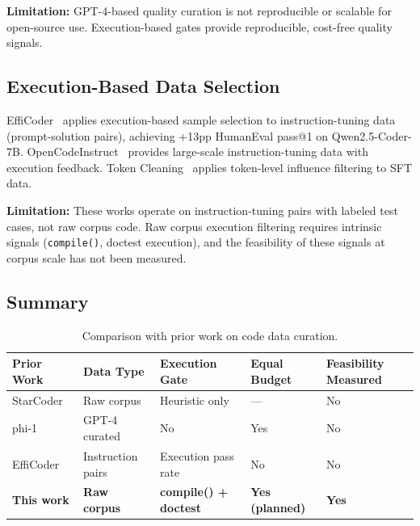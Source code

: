 \textbf{Limitation:} GPT-4-based quality curation is not reproducible or scalable for
open-source use. Execution-based gates provide reproducible, cost-free quality signals.

\subsection{Execution-Based Data Selection}

EffiCoder~\cite{Zeng2024EffiCoder} applies execution-based sample selection to instruction-tuning
data (prompt-solution pairs), achieving +13pp HumanEval pass@1 on Qwen2.5-Coder-7B.
OpenCodeInstruct~\cite{OpenCodeInstruct2025} provides large-scale instruction-tuning data with execution
feedback. Token Cleaning~\cite{TokenCleaning2025} applies token-level influence filtering to SFT data.

\textbf{Limitation:} These works operate on instruction-tuning pairs with labeled test cases,
not raw corpus code. Raw corpus execution filtering requires intrinsic signals (\texttt{compile()},
doctest execution), and the feasibility of these signals at corpus scale has not been measured.

\subsection{Summary}

\begin{table}[h]
\centering
\caption{Comparison with prior work on code data curation.}
\label{tab:related}
\begin{tabular}{lllll}
\toprule
\textbf{Prior Work} & \textbf{Data Type} & \textbf{Execution Gate} & \textbf{Equal Budget} & \textbf{Feasibility Measured} \\
\midrule
StarCoder~\cite{Li2023StarCoder} & Raw corpus & Heuristic only & --- & No \\
phi-1~\cite{Gunasekar2023Textbooks} & GPT-4 curated & No & Yes & No \\
EffiCoder~\cite{Zeng2024EffiCoder} & Instruction pairs & Execution pass rate & No & No \\
\textbf{This work} & \textbf{Raw corpus} & \textbf{compile() + doctest} & \textbf{Yes (planned)} & \textbf{Yes} \\
\bottomrule
\end{tabular}
\end{table}
